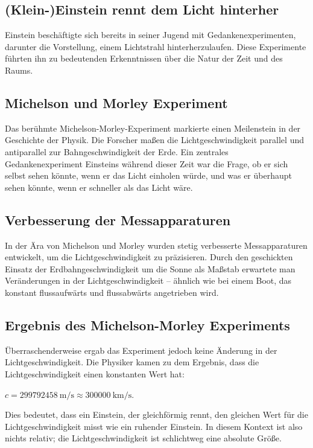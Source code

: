 \documentclass{report}
\begin{document}
\subsection{(Klein-)Einstein rennt dem Licht hinterher}
Einstein beschäftigte sich bereits in seiner Jugend mit Gedankenexperimenten, darunter die Vorstellung, einem Lichtstrahl hinterherzulaufen. Diese Experimente führten ihn zu bedeutenden Erkenntnissen über die Natur der Zeit und des Raums.
\subsection{Michelson und Morley Experiment}
Das berühmte Michelson-Morley-Experiment markierte einen Meilenstein in der Geschichte der Physik. Die Forscher maßen die Lichtgeschwindigkeit parallel und antiparallel zur Bahngeschwindigkeit der Erde. Ein zentrales Gedankenexperiment Einsteins während dieser Zeit war die Frage, ob er sich selbst sehen könnte, wenn er das Licht einholen würde, und was er überhaupt sehen könnte, wenn er schneller als das Licht wäre.
\subsection{Verbesserung der Messapparaturen}
In der Ära von Michelson und Morley wurden stetig verbesserte Messapparaturen entwickelt, um die Lichtgeschwindigkeit zu präzisieren. Durch den geschickten Einsatz der Erdbahngeschwindigkeit um die Sonne als Maßstab erwartete man Veränderungen in der Lichtgeschwindigkeit – ähnlich wie bei einem Boot, das konstant flussaufwärts und flussabwärts angetrieben wird.
\subsection{Ergebnis des Michelson-Morley Experiments}
\sloppy %
Überraschenderweise ergab das Experiment jedoch keine Änderung in der Lichtgeschwindigkeit.
Die Physiker kamen zu dem Ergebnis, dass die Lichtgeschwindigkeit einen konstanten Wert hat: 
\begin{center}
    \protect\boldmath $c = \SI{299792458}{\meter\per\second} \approx \SI{300000}{\kilo\meter\per\second}$\unboldmath.
\end{center}
Dies bedeutet, dass ein Einstein, der gleichförmig rennt, den gleichen Wert für die Lichtgeschwindigkeit misst wie ein ruhender Einstein. 
In diesem Kontext ist also nichts relativ; die Lichtgeschwindigkeit ist schlichtweg eine absolute Größe.
\end{document}
